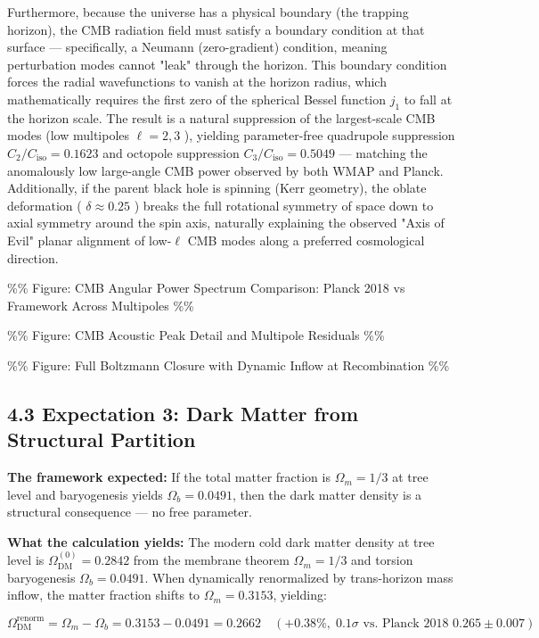 \documentclass[11pt,a4paper]{article}
\theoremstyle{definition}\newtheorem{definition}{Definition}
\theoremstyle{remark}\newtheorem{remark}{Remark}
\begin{document}
Furthermore, because the universe has a physical boundary (the trapping horizon), the CMB radiation field must satisfy a boundary condition at that surface — specifically, a Neumann (zero-gradient) condition, meaning perturbation modes cannot "leak" through the horizon. This boundary condition forces the radial wavefunctions to vanish at the horizon radius, which mathematically requires the first zero of the spherical Bessel function $j_1$ to fall at the horizon scale. The result is a natural suppression of the largest-scale CMB modes (low multipoles $\ell = 2, 3$ ), yielding parameter-free quadrupole suppression $C_2/C_{\text{iso}} = 0.1623$ and octopole suppression $C_3/C_{\text{iso}} = 0.5049$ — matching the anomalously low large-angle CMB power observed by both WMAP and Planck. Additionally, if the parent black hole is spinning (Kerr geometry), the oblate deformation ( $\delta \approx 0.25$ ) breaks the full rotational symmetry of space down to axial symmetry around the spin axis, naturally explaining the observed "Axis of Evil" planar alignment of low-$\ell$ CMB modes along a preferred cosmological direction.

\%\% Figure: CMB Angular Power Spectrum Comparison: Planck 2018 vs Framework Across Multipoles \%\%

\%\% Figure: CMB Acoustic Peak Detail and Multipole Residuals \%\%

\%\% Figure: Full Boltzmann Closure with Dynamic Inflow at Recombination \%\%
\subsection{4.3 Expectation 3: Dark Matter from Structural Partition}

\textbf{The framework expected:} If the total matter fraction is $\Omega_m = 1/3$ at tree level and baryogenesis yields $\Omega_b = 0.0491$, then the dark matter density is a structural consequence — no free parameter.

\textbf{What the calculation yields:} The modern cold dark matter density at tree level is $\Omega_{\text{DM}}^{(0)} = 0.2842$ from the membrane theorem $\Omega_m = 1/3$ and torsion baryogenesis $\Omega_b = 0.0491$. When dynamically renormalized by trans-horizon mass inflow, the matter fraction shifts to $\Omega_m = 0.3153$, yielding:


\begin{equation}
\boxed{\Omega_{\text{DM}}^{\text{renorm}} = \Omega_m - \Omega_b = 0.3153 - 0.0491 = \mathbf{0.2662} \quad (+0.38\%, \; 0.1\sigma \text{ vs. Planck 2018 } 0.265 \pm 0.007)}
\end{equation}
\end{document}
